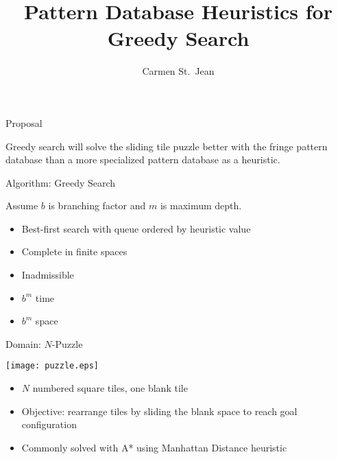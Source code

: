 \documentclass[style=unh]{powerdot}
\title{Pattern Database Heuristics for Greedy Search}
\author{Carmen St.\ Jean\vspace{0.2in}
  \vspace{.2in} \\
}
\date{\mbox{}}
\begin{document}
\maketitle



\begin{slide}{Proposal}

Greedy search will solve the sliding tile puzzle better with the fringe pattern database than a more specialized pattern database as a heuristic. 

\end{slide}



\begin{slide}{Algorithm: Greedy Search}

Assume $b$ is branching factor and $m$ is maximum depth.

\begin{itemize}
    \item Best-first search with queue ordered by heuristic value 
    \item Complete in finite spaces
    \item Inadmissible
    \item $b^m$ time
    \item $b^m$ space

    
\end{itemize}

\end{slide}


\begin{slide}{Domain: $N$-Puzzle}

\hspace{1in} \texttt{[image: puzzle.eps]}

\begin{itemize}
    \item $N$ numbered square tiles, one blank tile
    \item Objective: rearrange tiles by sliding the blank space to reach goal configuration
    \item Commonly solved with A* using Manhattan Distance heuristic
\end{itemize}

\end{slide} 
\end{document}
